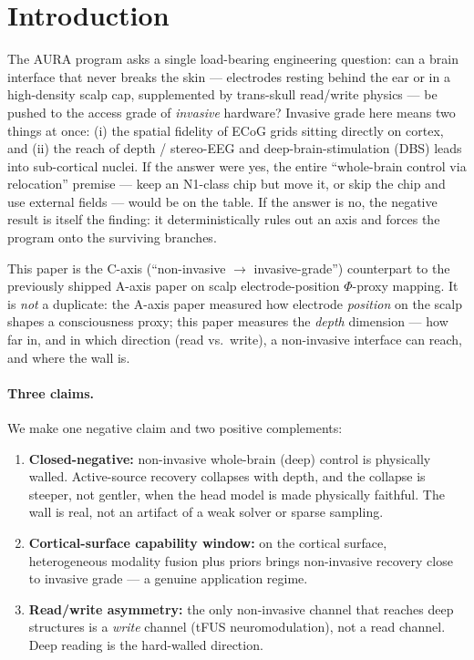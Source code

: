 \documentclass[11pt]{article}
\newcommand{\redbox}[1]{\textcolor{red!70!black}{\textbf{#1}}}
\newcommand{\greenbox}[1]{\textcolor{green!45!black}{\textbf{#1}}}
\begin{document}
\tableofcontents
\bigskip

\section{Introduction}
\label{sec:intro}

The AURA program asks a single load-bearing engineering question: can a brain
interface that never breaks the skin --- electrodes resting behind the ear or in a
high-density scalp cap, supplemented by trans-skull read/write physics --- be pushed
to the access grade of \emph{invasive} hardware? Invasive grade here means two
things at once: (i) the spatial fidelity of ECoG grids sitting directly on cortex,
and (ii) the reach of depth / stereo-EEG and deep-brain-stimulation (DBS) leads into
sub-cortical nuclei. If the answer were yes, the entire ``whole-brain control via
relocation'' premise --- keep an N1-class chip but move it, or skip the chip and use
external fields --- would be on the table. If the answer is no, the negative result
is itself the finding: it deterministically rules out an axis and forces the program
onto the surviving branches.

This paper is the C-axis (``non-invasive $\rightarrow$ invasive-grade'') counterpart
to the previously shipped A-axis paper on scalp electrode-position $\Phi$-proxy
mapping. It is \emph{not} a duplicate: the A-axis paper measured how electrode
\emph{position} on the scalp shapes a consciousness proxy; this paper measures the
\emph{depth} dimension --- how far in, and in which direction (read vs.\ write), a
non-invasive interface can reach, and where the wall is.

\paragraph{Three claims.} We make one negative claim and two positive complements:
\begin{enumerate}
  \item \redbox{Closed-negative:} non-invasive whole-brain (deep) control is
        physically walled. Active-source recovery collapses with depth, and the
        collapse is steeper, not gentler, when the head model is made physically
        faithful. The wall is real, not an artifact of a weak solver or sparse
        sampling.
  \item \greenbox{Cortical-surface capability window:} on the cortical surface,
        heterogeneous modality fusion plus priors brings non-invasive recovery
        close to invasive grade --- a genuine application regime.
  \item \textbf{Read/write asymmetry:} the only non-invasive channel that reaches
        deep structures is a \emph{write} channel (tFUS neuromodulation), not a read
        channel. Deep reading is the hard-walled direction.
\end{enumerate}
\end{document}
